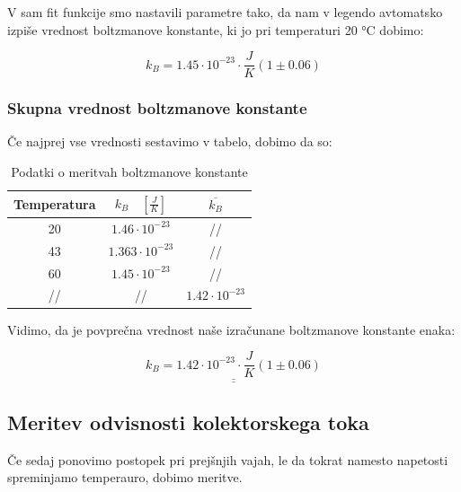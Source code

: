 \documentclass[11pt, a4paper]{article}
\theoremstyle{definition}
\theoremstyle{example}
\theoremstyle{izrek}
\begin{document}
V sam fit funkcije smo nastavili parametre tako, da nam v legendo avtomatsko izpiše vrednost boltzmanove konstante, ki jo pri temperaturi 20 °C dobimo:

$$k_B=1.45\cdot 10^{-23} \cdot \frac{J}{K} (1 \pm 0.06)$$

\subsubsection{Skupna vrednost boltzmanove konstante}
Če najprej vse vrednosti sestavimo v tabelo, dobimo da so: 

\begin{table}[H]
	\centering
	\begin{tabular}{|c|c|c|}
		\hline
		Temperatura  &  $k_B \quad [\frac{J}{K}]$ & $\overline{k_B}$\\
		\hline
		\hline
		20  & $1.46\cdot 10^{-23}$ & //\\
		\hline
		43  & $1.363\cdot 10^{-23}$ & //\\
		\hline
		60  & $1.45\cdot 10^{-23}$ & //\\
		\hline
		//&  // & $1.42 \cdot 10^{-23}$\\ 
		\hline
		\hline
	\end{tabular}
	\caption{Podatki o meritvah boltzmanove konstante}	
\end{table}

Vidimo, da je povprečna vrednost naše izračunane boltzmanove konstante enaka:

$$\underline{\underline{k_B=1.42 \cdot 10^{-23}\cdot \frac{J}{K} (1 \pm 0.06)}}$$

\pagebreak
\subsection{Meritev odvisnosti kolektorskega toka}
Če sedaj ponovimo postopek pri prejšnjih vajah, le da tokrat namesto napetosti spreminjamo temperauro, dobimo meritve. 
\end{document}
